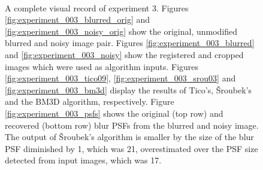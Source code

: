 \documentclass[12pt,notitlepage]{report}
\begin{document}
\begin{figure}[t]
	  ~
	  ~
  \caption[A complete visual record of experiment 3]{A complete visual record of experiment 3. Figures \ref{fig:experiment_003_blurred_orig} and \ref{fig:experiment_003_noisy_orig} show the original, unmodified blurred and noisy image pair. Figures \ref{fig:experiment_003_blurred} and \ref{fig:experiment_003_noisy} show the registered and cropped images which were used as algorithm inputs. Figures \ref{fig:experiment_003_tico09}, \ref{fig:experiment_003_srou03} and \ref{fig:experiment_003_bm3d} display the results of Tico's, Šroubek's and the BM3D algorithm, respectively. Figure \ref{fig:experiment_003_psfs} shows the original (top row) and recovered (bottom row) blur PSFs from the blurred and noisy image. The output of Šroubek's algorithm is smaller by the size of the blur PSF diminished by 1, which was 21, overestimated over the PSF size detected from input images, which was 17.}
  \label{fig:experiment_003_complete}
\end{figure}
\end{document}
